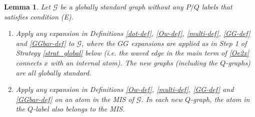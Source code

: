 \documentclass{article}
\newcommand{\1}{\mathds{1}}
\numberwithin{equation}{section}
\renewcommand{\cal}{\mathcal}
\theoremstyle{plain} %
\newtheorem{lemma}[theorem]{Lemma}
\theoremstyle{remark}
\begin{document}
\begin{lemma}\label{lem localgood3}
Let $\cal G$ be a globally standard graph without any $P/Q$ labels that satisfies condition (E).
\begin{enumerate}
\item Apply any expansion in Definitions \ref{dot-def}, \ref{Ow-def}, \ref{multi-def}, \ref{GG-def} and \ref{GGbar-def} to $\cal G$, where the $GG$ expansions are applied as in Step 1 of Strategy \ref{strat_global} below (i.e. the waved edge in the main term of \eqref{Oe2x} connects $x$ with an internal atom). The new graphs (including the $Q$-graphs) are all globally standard.

\item Apply any expansion in Definitions \ref{Ow-def}, \ref{multi-def}, \ref{GG-def} and \ref{GGbar-def} on an atom in the MIS of $\cal G$. In each new $Q$-graph, the atom in the $Q$-label also belongs to the MIS. %

\end{enumerate}
\end{lemma}
\end{document}
